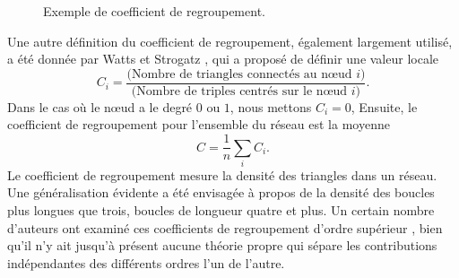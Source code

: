 \begin{figure}[h!]
	\begin{center}
	\end{center}
	\caption{ Exemple de coefficient de regroupement.}
	\label{Clustering}
\end{figure}

Une autre définition du coefficient de regroupement, également largement utilisé, a été donnée par Watts et Strogatz \cite{WS1998},
qui a proposé de définir une valeur locale
\begin{equation}
C_i=\frac{\text{(Nombre de triangles connectés au nœud $i$)}}{\text{(Nombre de triples centrés sur le nœud $i$)}}.
\end{equation}
Dans le cas où le nœud a le degré $0$ ou $1$, nous mettons $C_i=0$, Ensuite, le coefficient de regroupement pour l'ensemble
du réseau est la moyenne
\begin{equation}
C=\frac{1}{n}\sum_i C_i.
\end{equation}
Le coefficient de regroupement mesure la densité des triangles dans un réseau. Une généralisation évidente a été envisagée à 
propos de la densité des boucles plus longues que trois, boucles de longueur quatre et plus. Un certain nombre d'auteurs ont 
examiné ces coefficients de regroupement d'ordre supérieur \cite{Ne2003,BC2003,Fron-al2002,Gle-al2001}, bien qu'il n'y ait jusqu'à présent
aucune théorie propre qui sépare les contributions indépendantes des différents ordres l'un de l'autre.
